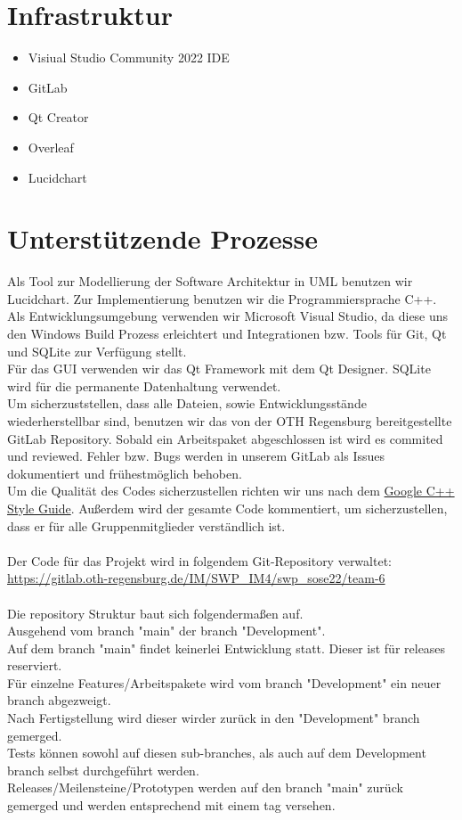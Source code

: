 \documentclass[12pt,a4paper,onecolumn]{article}
\begin{document}
\section{Infrastruktur}
\begin{itemize}
    \item Visiual Studio Community 2022 IDE
    \item GitLab
    \item Qt Creator
    \item Overleaf
    \item Lucidchart
\end{itemize}
\section{Unterstützende Prozesse}
Als Tool zur Modellierung der Software Architektur in UML benutzen wir Lucidchart.
Zur Implementierung benutzen wir die Programmiersprache C++. Als Entwicklungsumgebung verwenden wir Microsoft Visual Studio, da diese uns den Windows Build Prozess erleichtert und Integrationen bzw. Tools für Git, Qt und SQLite zur Verfügung stellt.\\
Für das GUI verwenden wir das Qt Framework mit dem Qt Designer. SQLite wird für die permanente Datenhaltung verwendet.\\
Um sicherzuststellen, dass alle Dateien, sowie Entwicklungsstände wiederherstellbar sind, benutzen wir das von der OTH Regensburg bereitgestellte GitLab Repository. Sobald ein Arbeitspaket abgeschlossen ist wird es commited und reviewed. Fehler bzw. Bugs werden in unserem GitLab als Issues dokumentiert und frühestmöglich behoben.\\
Um die Qualität des Codes sicherzustellen richten wir uns nach dem \href{https://google.github.io/styleguide/cppguide.html}{Google C++ Style Guide}. Außerdem wird der gesamte Code kommentiert, um sicherzustellen, dass er für alle Gruppenmitglieder verständlich ist.\\
\\
Der Code für das Projekt wird in folgendem Git-Repository verwaltet:\\
\url{https://gitlab.oth-regensburg.de/IM/SWP_IM4/swp_sose22/team-6}\\\\
Die repository Struktur baut sich folgendermaßen auf.\\
Ausgehend vom branch "main" der branch "Development".\\
Auf dem branch "main" findet keinerlei Entwicklung statt. Dieser ist für releases reserviert.\\
Für einzelne Features/Arbeitspakete wird vom branch "Development" ein neuer branch abgezweigt.\\
Nach Fertigstellung wird dieser wirder zurück in den "Development" branch gemerged.\\
Tests können sowohl auf diesen sub-branches, als auch auf dem Development branch selbst durchgeführt werden.\\
Releases/Meilensteine/Prototypen werden auf den branch "main" zurück gemerged und werden entsprechend mit einem tag versehen.


\end{document}

